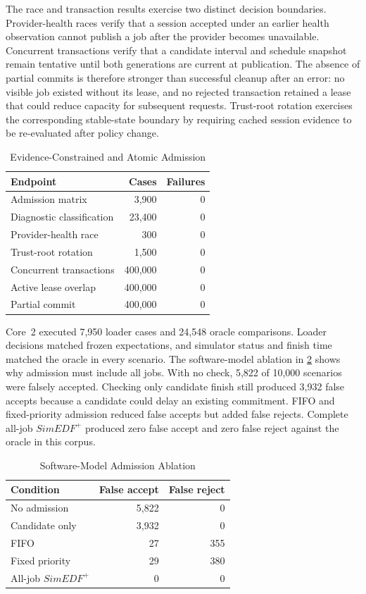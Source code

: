 \documentclass[lettersize,journal]{IEEEtran}
\begin{document}
The race and transaction results exercise two distinct decision boundaries.
Provider-health races verify that a session accepted under an earlier health
observation cannot publish a job after the provider becomes unavailable.
Concurrent transactions verify that a candidate interval and schedule snapshot
remain tentative until both generations are current at publication. The absence
of partial commits is therefore stronger than successful cleanup after an
error: no visible job existed without its lease, and no rejected transaction
retained a lease that could reduce capacity for subsequent requests. Trust-root
rotation exercises the corresponding stable-state boundary by requiring cached
session evidence to be re-evaluated after policy change.

\begin{table}[t]
\caption{Evidence-Constrained and Atomic Admission}
\label{tab:admission}
\centering
\footnotesize
\begin{tabular}{@{}lrr@{}}
\toprule
Endpoint & Cases & Failures \\
\midrule
Admission matrix & 3,900 & 0 \\
Diagnostic classification & 23,400 & 0 \\
Provider-health race & 300 & 0 \\
Trust-root rotation & 1,500 & 0 \\
Concurrent transactions & 400,000 & 0 \\
Active lease overlap & 400,000 & 0 \\
Partial commit & 400,000 & 0 \\
\bottomrule
\end{tabular}
\end{table}

Core~2 executed 7,950 loader cases and 24,548 oracle comparisons. Loader
decisions matched frozen expectations, and simulator status and finish time
matched the oracle in every scenario. The software-model ablation in
\cref{tab:ablation} shows why admission must include all jobs. With no check,
5,822 of 10,000 scenarios were falsely accepted. Checking only candidate finish
still produced 3,932 false accepts because a candidate could delay an existing
commitment. FIFO and fixed-priority admission reduced false accepts but added
false rejects. Complete all-job $SimEDF^+$ produced zero false accept and zero
false reject against the oracle in this corpus.

\begin{table}[t]
\caption{Software-Model Admission Ablation}
\label{tab:ablation}
\centering
\footnotesize
\begin{tabular}{@{}lrr@{}}
\toprule
Condition & False accept & False reject \\
\midrule
No admission & 5,822 & 0 \\
Candidate only & 3,932 & 0 \\
FIFO & 27 & 355 \\
Fixed priority & 29 & 380 \\
All-job $SimEDF^+$ & 0 & 0 \\
\bottomrule
\end{tabular}
\end{table}
\end{document}
